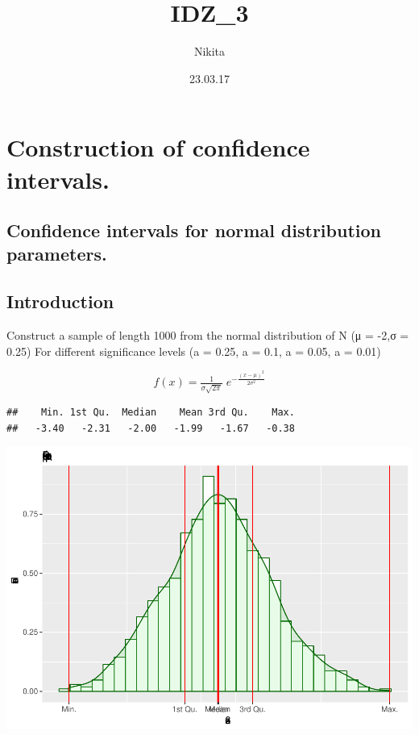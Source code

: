 \documentclass[]{article}
\title{IDZ\_3}
\author{Nikita}
\date{23.03.17}
\begin{document}
\maketitle

{
\setcounter{tocdepth}{2}
\tableofcontents
}
\section{Construction of confidence
intervals.}\label{construction-of-confidence-intervals.}

\subsection{Confidence intervals for normal distribution
parameters.}\label{confidence-intervals-for-normal-distribution-parameters.}

\subsection{Introduction}\label{introduction}

Construct a sample of length 1000 from the normal distribution of N (μ =
-2,σ = 0.25) For different significance levels (a = 0.25, a = 0.1, a =
0.05, a = 0.01)

\[f(x)={\tfrac {1}{\sigma {\sqrt {2\pi }}}}\;e^{-{\frac {(x-\mu )^{2}}{2\sigma ^{2}}}}\]

\begin{verbatim}
##    Min. 1st Qu.  Median    Mean 3rd Qu.    Max. 
##   -3.40   -2.31   -2.00   -1.99   -1.67   -0.38
\end{verbatim}

\includegraphics{IDZ_3_files/figure-latex/graph-1.pdf}
\end{document}
